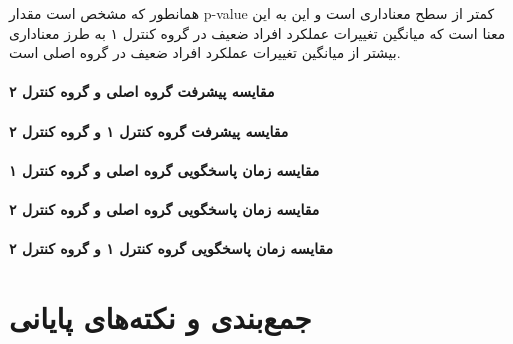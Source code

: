\documentclass[twoside, a4paper,11pt]{book}
\numberwithin{equation}{chapter}
\numberwithin{table}{chapter}
\numberwithin{figure}{chapter}
\numberwithin{equation}{chapter}
\begin{document}
همانطور که مشخص است مقدار p-value کمتر از سطح معناداری است و این به این معنا است که میانگین تغییرات عملکرد افراد ضعیف در گروه کنترل ۱ به طرز معناداری بیشتر از میانگین تغییرات عملکرد افراد ضعیف در گروه اصلی است.

\subsubsection{مقایسه پیشرفت گروه اصلی و گروه کنترل ۲}
\subsubsection{مقایسه پیشرفت گروه کنترل ۱ و گروه کنترل ۲}
\subsubsection{مقایسه زمان پاسخگویی گروه اصلی و گروه کنترل ۱}



\subsubsection{مقایسه زمان پاسخگویی گروه اصلی و گروه کنترل ۲}
\subsubsection{مقایسه زمان پاسخگویی گروه کنترل ۱ و گروه کنترل ۲}

\chapter{جمع‌بندی و نکته‌های پایانی}
\label{chapter:conclusion}
\thispagestyle{plain}



\newpage
\thispagestyle{empty}
\mbox{}

\linespread{1}


\small{

\renewcommand{\bibname}{مراجع}
\clearpage

}

\newpage
\thispagestyle{empty}
\mbox{}
\begin{multicols}{2}
\begin{doublespace}

\printglossary[type=latin]

\newpage
\thispagestyle{empty}
\mbox{}

\clearpage
{}
\printglossary[type=persian]
\end{doublespace}
\end{multicols}
\end{document}
